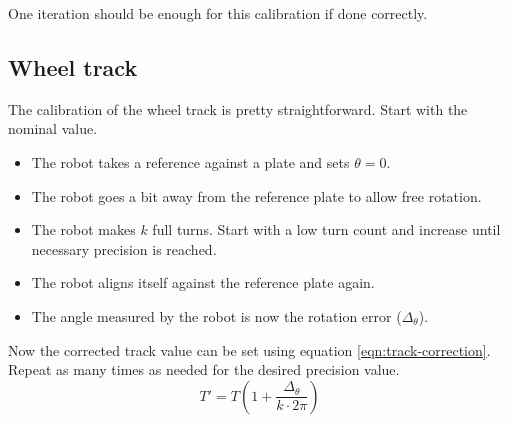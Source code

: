 \documentclass[a4paper]{paper}
\begin{document}
One iteration should be enough for this calibration if done correctly.



\subsection{Wheel track}
The calibration of the wheel track is pretty straightforward.
Start with the nominal value.
\begin{itemize}
    \item The robot takes a reference against a plate and sets $\theta = 0$.
    \item The robot goes a bit away from the reference plate to allow free rotation.
    \item The robot makes $k$ full turns.
        Start with a low turn count and increase until necessary precision is reached.
    \item The robot aligns itself against the reference plate again.
    \item The angle measured by the robot is now the rotation error ($\Delta_\theta$).
\end{itemize}
Now the corrected track value can be set using equation \ref{eqn:track-correction}.
Repeat as many times as needed for the desired precision value.
\begin{equation}
    T' = T \left(1 + \frac{\Delta_\theta}{k \cdot 2\pi}\right)
    \label{eqn:track-correction}
\end{equation}
\end{document}
